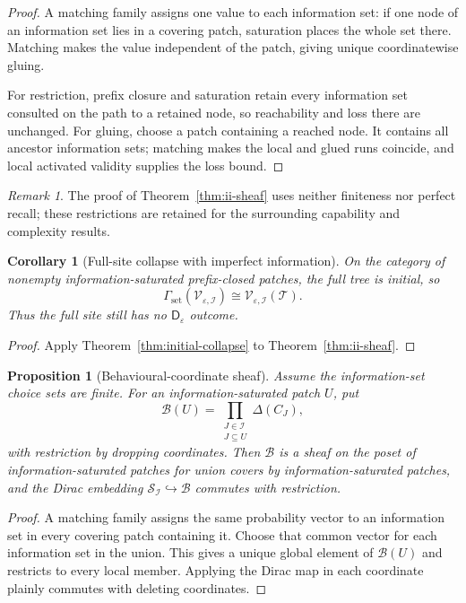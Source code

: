 \documentclass[11pt]{article}
\theoremstyle{plain}
\newtheorem{proposition}[theorem]{Proposition}
\newtheorem{corollary}[theorem]{Corollary}
\theoremstyle{definition}
\theoremstyle{remark}
\newtheorem{remark}[theorem]{Remark}
\newcommand{\eps}{\varepsilon}
\begin{document}
\begin{proof}
A matching family assigns one value to each information set: if one node of an
information set lies in a covering patch, saturation places the whole set there.
Matching makes the value independent of the patch, giving unique coordinatewise
gluing.

For restriction, prefix closure and saturation retain every information set
consulted on the path to a retained node, so reachability and loss there are
unchanged. For gluing, choose a patch containing a reached node. It contains all
ancestor information sets; matching makes the local and glued runs coincide, and
local activated validity supplies the loss bound.
\end{proof}

\begin{remark}
The proof of Theorem~\ref{thm:ii-sheaf} uses neither finiteness nor perfect
recall; these restrictions are retained for the surrounding capability and
complexity results.
\end{remark}


\begin{corollary}[Full-site collapse with imperfect information]
\label{cor:ii-collapse}
On the category of nonempty information-saturated prefix-closed patches, the
full tree is initial, so
\[
\Gamma_{\mathrm{set}}(\mathscr V_{\eps,\mathcal I})
\cong\mathscr V_{\eps,\mathcal I}(\mathcal T).
\]
Thus the full site still has no $\mathsf D_\eps$ outcome.
\end{corollary}

\begin{proof}
Apply Theorem~\ref{thm:initial-collapse} to
Theorem~\ref{thm:ii-sheaf}.
\end{proof}

\begin{proposition}[Behavioural-coordinate sheaf]
\label{prop:behavioural-sheaf}
Assume the information-set choice sets are finite. For an
information-saturated patch $U$, put
\[
\mathscr B(U)=
\prod_{\substack{J\in\mathcal I\\J\subseteq U}}\Delta(C_J),
\]
with restriction by dropping coordinates. Then $\mathscr B$ is a sheaf on the poset of information-saturated patches
for union covers by information-saturated patches, and the Dirac embedding
$\mathscr S_{\mathcal I}\hookrightarrow\mathscr B$ commutes with restriction.
\end{proposition}

\begin{proof}
A matching family assigns the same probability vector to an information set in
every covering patch containing it. Choose that common vector for each
information set in the union. This gives a unique global element of
$\mathscr B(U)$ and restricts to every local member. Applying the Dirac map in
each coordinate plainly commutes with deleting coordinates.
\end{proof}
\end{document}

